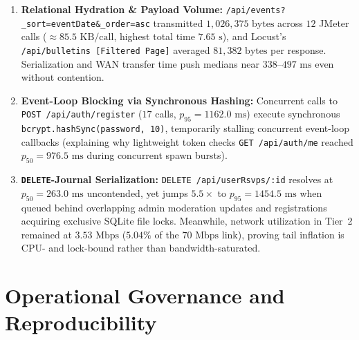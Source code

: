 \documentclass[11pt,letterpaper]{article}
\begin{document}
\begin{enumerate}
  \item \textbf{Relational Hydration \& Payload Volume:} \texttt{/api/events?\_sort=eventDate\&\_order=asc} transmitted $1{,}026{,}375\text{ bytes}$ across $12$ JMeter calls ($\approx 85.5\text{ KB/call}$, highest total time $7.65\text{ s}$), and Locust's \texttt{/api/bulletins [Filtered Page]} averaged $81{,}382\text{ bytes}$ per response. Serialization and WAN transfer time push medians near $338\text{--}497\text{ ms}$ even without contention.
  \item \textbf{Event-Loop Blocking via Synchronous Hashing:} Concurrent calls to \texttt{POST /api/auth/register} ($17$ calls, $p_{95} = 1162.0\text{ ms}$) execute synchronous \texttt{bcrypt.hashSync(password, 10)}, temporarily stalling concurrent event-loop callbacks (explaining why lightweight token checks \texttt{GET /api/auth/me} reached $p_{50} = 976.5\text{ ms}$ during concurrent spawn bursts).
  \item \textbf{\texttt{DELETE}-Journal Serialization:} \texttt{DELETE /api/userRsvps/:id} resolves at $p_{50} = 263.0\text{ ms}$ uncontended, yet jumps $5.5\times$ to $p_{95} = 1454.5\text{ ms}$ when queued behind overlapping admin moderation updates and registrations acquiring exclusive SQLite file locks. Meanwhile, network utilization in Tier~2 remained at $3.53\text{ Mbps}$ ($5.04\%$ of the $70\text{ Mbps}$ link), proving tail inflation is CPU- and lock-bound rather than bandwidth-saturated.
\end{enumerate}

\section{Operational Governance and Reproducibility}
\end{document}
